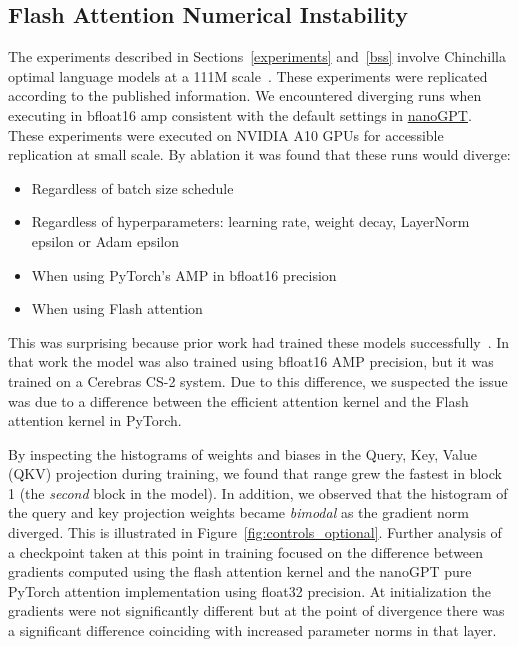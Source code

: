 \documentclass{article}
\begin{document}
\subsection{Flash Attention Numerical Instability}\label{instability}

The experiments described in Sections~\ref{experiments} and~\ref{bss} involve
Chinchilla optimal language models at a 111M scale~\citep{dey2023cerebrasgpt}.
These experiments were replicated according to the published information. We
encountered diverging runs when executing in bfloat16 \ac{amp} consistent with
the default settings in \href{https://github.com/karpathy/nanoGPT}{nanoGPT}.
These experiments were executed on NVIDIA A10 GPUs for accessible replication at
small scale. By ablation it was found that these runs would diverge:

\begin{itemize}
    \item Regardless of batch size schedule
    \item Regardless of hyperparameters: learning rate, weight decay, LayerNorm epsilon or Adam epsilon~\citep{wortsman2023small}
    \item When using PyTorch's AMP in bfloat16 precision
    \item When using Flash attention~\citep{dao2022flash,golden2024flash}
\end{itemize}

This was surprising because prior work had trained these models
successfully~\citep{dey2023cerebrasgpt}. In that work the model was also trained
using bfloat16 AMP precision, but it was trained on a Cerebras CS-2 system.
Due to this difference, we suspected the issue was due to a difference between
the efficient attention kernel and the Flash attention kernel in PyTorch.

By inspecting the histograms of weights and biases in the Query, Key, Value
(QKV) projection during training, we found that range grew the fastest in block
1 (the \emph{second} block in the model). In addition, we
observed that the histogram of the query and key projection weights became
\emph{bimodal} as the gradient norm diverged. This is illustrated in
Figure~\ref{fig:controls_optional}. Further analysis of a checkpoint taken at
this point in training focused on the difference between gradients computed
using the flash attention kernel and the nanoGPT pure PyTorch attention
implementation using float32 precision. At initialization the gradients were not
significantly different but at the point of divergence there was a significant
difference coinciding with increased parameter norms in that layer.
\end{document}

